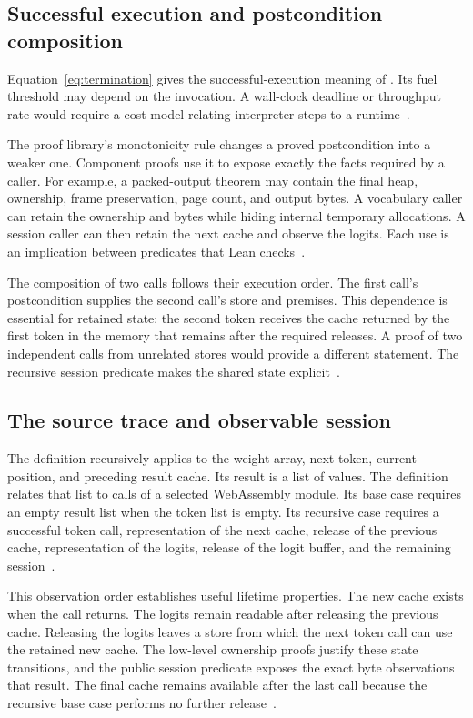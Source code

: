 \subsection{Successful execution and postcondition composition}

Equation~\eqref{eq:termination} gives the successful-execution meaning of .  Its fuel threshold may depend on the invocation.  A wall-clock deadline or throughput rate would require a cost model relating interpreter steps to a runtime~\cite{termination}.

The proof library's monotonicity rule changes a proved postcondition into a weaker one.  Component proofs use it to expose exactly the facts required by a caller.  For example, a packed-output theorem may contain the final heap, ownership, frame preservation, page count, and output bytes.  A vocabulary caller can retain the ownership and bytes while hiding internal temporary allocations.  A session caller can then retain the next cache and observe the logits.  Each use is an implication between predicates that Lean checks~\cite{entry,session}.

The composition of two calls follows their execution order.  The first call's postcondition supplies the second call's store and premises.  This dependence is essential for retained state: the second token receives the cache returned by the first token in the memory that remains after the required releases.  A proof of two independent calls from unrelated stores would provide a different statement.  The recursive session predicate makes the shared state explicit~\cite{session}.

\subsection{The source trace and observable session}

The definition  recursively applies  to the weight array, next token, current position, and preceding result cache.  Its result is a list of  values.  The definition  relates that list to calls of a selected WebAssembly module.  Its base case requires an empty result list when the token list is empty.  Its recursive case requires a successful token call, representation of the next cache, release of the previous cache, representation of the logits, release of the logit buffer, and the remaining session~\cite{session}.

This observation order establishes useful lifetime properties.  The new cache exists when the call returns.  The logits remain readable after releasing the previous cache.  Releasing the logits leaves a store from which the next token call can use the retained new cache.  The low-level ownership proofs justify these state transitions, and the public session predicate exposes the exact byte observations that result.  The final cache remains available after the last call because the recursive base case performs no further release~\cite{session}.

